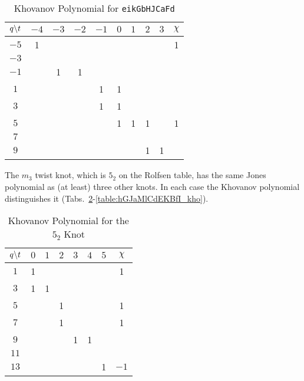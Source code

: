 \documentclass{article}
\theoremstyle{plain}
\begin{document}
        \begin{table}[H]
            \centering
            \begin{tabular}{| c | c | c | c | c | c | c | c | c | c |}
                \hline
                $q\symbol{92}t$&$-4$&$-3$&$-2$&$-1$&$0$&$1$&$2$&$3$&$\chi$\\
                \hline
                $-5$&1&&&&&&&&1\\
                \hline
                $-3$&&&&&&&&&\\
                \hline
                $-1$&&1&1&&&&&&\\
                \hline
                $1$&&&&1&1&&&&\\
                \hline
                $3$&&&&1&1&&&&\\
                \hline
                $5$&&&&&1&1&1&&1\\
                \hline
                $7$&&&&&&&&&\\
                \hline
                $9$&&&&&&&1&1&\\
                \hline
            \end{tabular}
            \caption{Khovanov Polynomial for \texttt{eikGbHJCaFd}}
            \label{table:eikGbHJCaFd_kho}
        \end{table}
        The $m_{3}$ twist knot, which is $5_{2}$ on the Rolfsen table,
        has the same Jones polynomial as (at least) three other knots. In each
        case the Khovanov polynomial distinguishes it
        (Tabs.~\ref{table:m_3_kho}-\ref{table:hGJaMlCdEKBfI_kho}).
        \begin{table}[H]
            \centering
            \begin{tabular}{| c | c | c | c | c | c | c | c |}
                \hline
                $q\symbol{92}t$&$0$&$1$&$2$&$3$&$4$&$5$&$\chi$\\
                \hline
                $1$&1&&&&&&1\\
                \hline
                $3$&1&1&&&&&\\
                \hline
                $5$&&&1&&&&1\\
                \hline
                $7$&&&1&&&&1\\
                \hline
                $9$&&&&1&1&&\\
                \hline
                $11$&&&&&&&\\
                \hline
                $13$&&&&&&1&$-1$\\
                \hline
            \end{tabular}
            \caption{Khovanov Polynomial for the $5_{2}$ Knot}
            \label{table:m_3_kho}
        \end{table}
\end{document}
